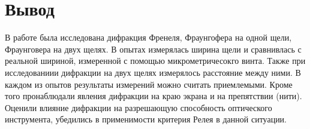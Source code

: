 \documentclass[a4paper,12pt]{article}
\begin{document}
\section*{Вывод}
В работе была исследована дифракция Френеля, Фраунгофера на одной щели, Фраунговера на двух щелях. В опытах измерялась ширина щели и сравнивлась с реальной шириной, измеренной с помощью микрометричесокго винта. Также при исследованиии дифракции на двух щелях измерялось расстояние между ними. В каждом из опытов результаты измерений можно считать приемлемыми. Кроме того пронаблюдали явления дифракции на краю экрана и на препятствии (нити). \\
Оценили влияние дифракции на разрешающую способность оптического инструмента, убедились в применимости критерия Релея в данной ситуации. 
\end{document}
